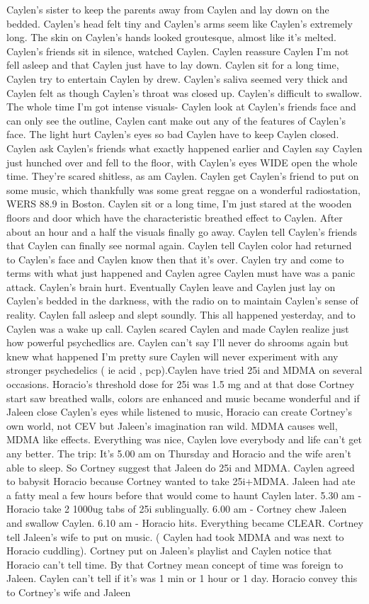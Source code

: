 \documentclass[12pt]{book}
\begin{document}
Caylen's sister to keep the parents away from Caylen and lay down on the bedded. Caylen's head felt tiny and Caylen's arms seem like Caylen's extremely long. The skin on Caylen's hands looked groutesque, almost like it's melted. Caylen's friends sit in silence, watched Caylen. Caylen reassure Caylen I'm not fell asleep and that Caylen just have to lay down. Caylen sit for a long time, Caylen try to entertain Caylen by drew. Caylen's saliva seemed very thick and Caylen felt as though Caylen's throat was closed up. Caylen's difficult to swallow. The whole time I'm got intense visuals- Caylen look at Caylen's friends face and can only see the outline, Caylen cant make out any of the features of Caylen's face. The light hurt Caylen's eyes so bad Caylen have to keep Caylen closed. Caylen ask Caylen's friends what exactly happened earlier and Caylen say Caylen just hunched over and fell to the floor, with Caylen's eyes WIDE open the whole time. They're scared shitless, as am Caylen. Caylen get Caylen's friend to put on some music, which thankfully was some great reggae on a wonderful radiostation, WERS 88.9 in Boston. Caylen sit or a long time, I'm just stared at the wooden floors and door which have the characteristic breathed effect to Caylen. After about an hour and a half the visuals finally go away. Caylen tell Caylen's friends that Caylen can finally see normal again. Caylen tell Caylen color had returned to Caylen's face and Caylen know then that it's over. Caylen try and come to terms with what just happened and Caylen agree Caylen must have was a panic attack. Caylen's brain hurt. Eventually Caylen leave and Caylen just lay on Caylen's bedded in the darkness, with the radio on to maintain Caylen's sense of reality. Caylen fall asleep and slept soundly. This all happened yesterday, and to Caylen was a wake up call. Caylen scared Caylen and made Caylen realize just how powerful psychedlics are. Caylen can't say I'll never do shrooms again but knew what happened I'm pretty sure Caylen will never experiment with any stronger psychedelics ( ie acid , pcp).Caylen have tried 25i and MDMA on several occasions. Horacio's threshold dose for 25i was 1.5 mg and at that dose Cortney start saw breathed walls, colors are enhanced and music became wonderful and if Jaleen close Caylen's eyes while listened to music, Horacio can create Cortney's own world, not CEV but Jaleen's imagination ran wild. MDMA causes well, MDMA like effects. Everything was nice, Caylen love everybody and life can't get any better. The trip: It's 5.00 am on Thursday and Horacio and the wife aren't able to sleep. So Cortney suggest that Jaleen do 25i and MDMA. Caylen agreed to babysit Horacio because Cortney wanted to take 25i+MDMA. Jaleen had ate a fatty meal a few hours before that would come to haunt Caylen later. 5.30 am - Horacio take 2 1000ug tabs of 25i sublingually. 6.00 am - Cortney chew Jaleen and swallow Caylen. 6.10 am - Horacio hits. Everything became CLEAR. Cortney tell Jaleen's wife to put on music. ( Caylen had took MDMA and was next to Horacio cuddling). Cortney put on Jaleen's playlist and Caylen notice that Horacio can't tell time. By that Cortney mean concept of time was foreign to Jaleen. Caylen can't tell if it's was 1 min or 1 hour or 1 day. Horacio convey this to Cortney's wife and Jaleen 
\end{document}
